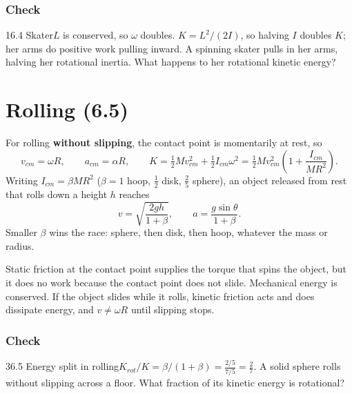 \documentclass[11pt]{article}
\begin{document}
\subsubsection{Check}\mbox{}

\begin{q}{1}{6.4 Skater}{$L$ is conserved, so $\omega$ doubles. $K = L^2/(2I)$, so halving $I$ doubles $K$; her arms do positive work pulling inward.}
A spinning skater pulls in her arms, halving her rotational inertia. What happens to her rotational kinetic energy?
\end{q}

\section{Rolling (6.5)}\label{sec:4}

For rolling \textbf{without slipping}, the contact point is momentarily at rest, so
\[ v_{cm} = \omega R, \qquad a_{cm} = \alpha R, \qquad K = \tfrac12 Mv_{cm}^2 + \tfrac12 I_{cm}\omega^2 = \tfrac12 Mv_{cm}^2\left(1 + \frac{I_{cm}}{MR^2}\right). \]
Writing $I_{cm} = \beta MR^2$ ($\beta = 1$ hoop, $\tfrac12$ disk, $\tfrac25$ sphere), an object released from rest that rolls down a height $h$ reaches
\[ v = \sqrt{\frac{2gh}{1 + \beta}}, \qquad a = \frac{g\sin\theta}{1 + \beta}. \]
Smaller $\beta$ wins the race: sphere, then disk, then hoop, whatever the mass or radius.

\begin{keyidea}
Static friction at the contact point supplies the torque that spins the object, but it does no work because the contact point does not slide. Mechanical energy is conserved. If the object slides while it rolls, kinetic friction acts and does dissipate energy, and $v \ne \omega R$ until slipping stops.
\end{keyidea}

\subsubsection{Check}\mbox{}

\begin{q}{3}{6.5 Energy split in rolling}{$K_{rot}/K = \beta/(1 + \beta) = \tfrac{2/5}{7/5} = \tfrac27$.}
A solid sphere rolls without slipping across a floor. What fraction of its kinetic energy is rotational?
\end{q}
\end{document}
